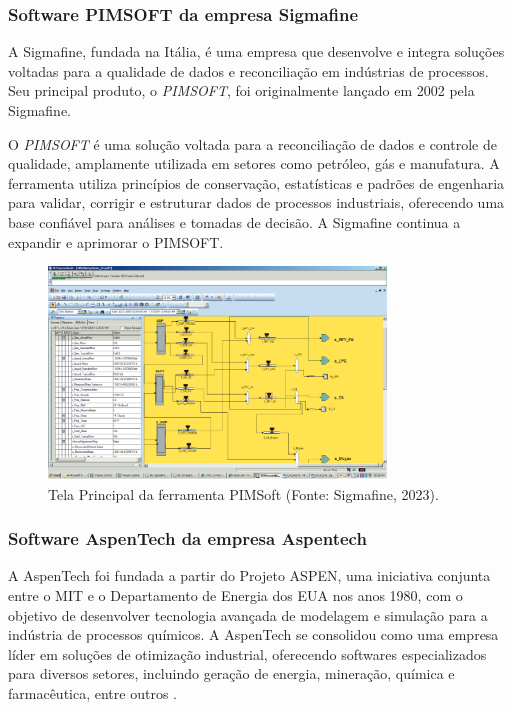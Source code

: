 \subsubsection{Software PIMSOFT da empresa Sigmafine}

A Sigmafine, fundada na Itália, é uma empresa que desenvolve e integra soluções voltadas para a qualidade de dados e reconciliação em indústrias de processos. Seu principal produto, o \textit{PIMSOFT}, foi originalmente lançado em 2002 pela Sigmafine.

O \textit{PIMSOFT} é uma solução voltada para a reconciliação de dados e controle de qualidade, amplamente utilizada em setores como petróleo, gás e manufatura. A ferramenta utiliza princípios de conservação, estatísticas e padrões de engenharia para validar, corrigir e estruturar dados de processos industriais, oferecendo uma base confiável para análises e tomadas de decisão. A Sigmafine continua a expandir e aprimorar o PIMSOFT.

\begin{figure}[htbp!]
	\centering
	\includegraphics[width=0.8\textwidth]{figuras/sigmafine-pimsoft.png}
	\caption{Tela Principal da ferramenta PIMSoft (Fonte: Sigmafine, 2023).}
	\label{fig:Sigmafine}
\end{figure}

\subsubsection{Software AspenTech da empresa Aspentech}

A AspenTech foi fundada a partir do Projeto ASPEN, uma iniciativa conjunta entre o MIT e o Departamento de Energia dos EUA nos anos 1980, com o objetivo de desenvolver tecnologia avançada de modelagem e simulação para a indústria de processos químicos. A AspenTech se consolidou como uma empresa líder em soluções de otimização industrial, oferecendo softwares especializados para diversos setores, incluindo geração de energia, mineração, química e farmacêutica, entre outros \cite{aspen}.

